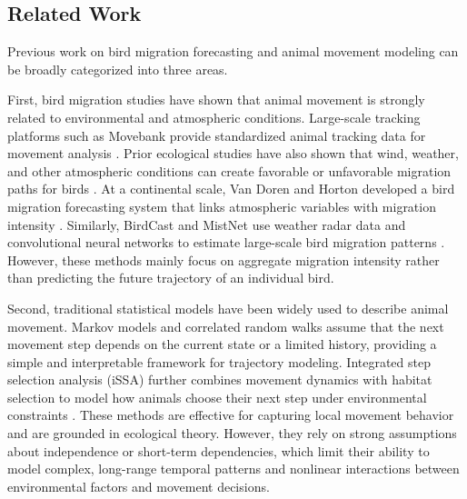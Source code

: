 \documentclass{article}
\begin{document}
\subsection{Related Work}

Previous work on bird migration forecasting and animal movement modeling can be broadly categorized into three areas.

First, bird migration studies have shown that animal movement is strongly related to environmental and atmospheric conditions. Large-scale tracking platforms such as Movebank provide standardized animal tracking data for movement analysis \cite{kranstauber2011movebank}. Prior ecological studies have also shown that wind, weather, and other atmospheric conditions can create favorable or unfavorable migration paths for birds \cite{shamounbaranes2017atmospheric}. At a continental scale, Van Doren and Horton developed a bird migration forecasting system that links atmospheric variables with migration intensity \cite{vandoren2018continental}. Similarly, BirdCast and MistNet use weather radar data and convolutional neural networks to estimate large-scale bird migration patterns \cite{lin2019mistnet}. However, these methods mainly focus on aggregate migration intensity rather than predicting the future trajectory of an individual bird.

Second, traditional statistical models have been widely used to describe animal movement. Markov models and correlated random walks assume that the next movement step depends on the current state or a limited history, providing a simple and interpretable framework for trajectory modeling. Integrated step selection analysis (iSSA) further combines movement dynamics with habitat selection to model how animals choose their next step under environmental constraints \cite{avgar2016integrated}. These methods are effective for capturing local movement behavior and are grounded in ecological theory. However, they rely on strong assumptions about independence or short-term dependencies, which limit their ability to model complex, long-range temporal patterns and nonlinear interactions between environmental factors and movement decisions.
\end{document}
